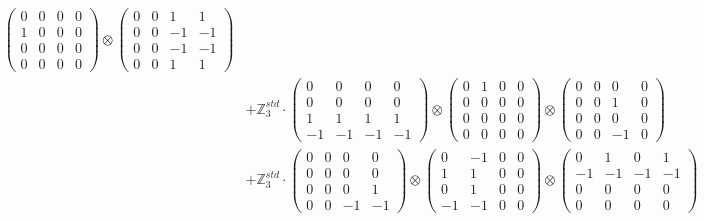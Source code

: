 \documentclass{article}
\begin{document}
{\begin{align}
            \begin{pmatrix} 0 & 0 & 0 & 0 \\ 1 & 0 & 0 & 0 \\ 0 & 0 & 0 & 0 \\ 0 & 0 & 0 & 0 \end{pmatrix} \otimes 
            \begin{pmatrix} 0 & 0 & 1 & 1 \\ 0 & 0 & -1 & -1 \\ 0 & 0 & -1 & -1 \\ 0 & 0 & 1 & 1 \end{pmatrix} \\ 
        &+ \label{Rs4-Rc15-Solution-1-c12} \mathbb{Z}_3^{std} \cdot 
            \begin{pmatrix} 0 & 0 & 0 & 0 \\ 0 & 0 & 0 & 0 \\ 1 & 1 & 1 & 1 \\ -1 & -1 & -1 & -1 \end{pmatrix} \otimes 
            \begin{pmatrix} 0 & 1 & 0 & 0 \\ 0 & 0 & 0 & 0 \\ 0 & 0 & 0 & 0 \\ 0 & 0 & 0 & 0 \end{pmatrix} \otimes 
            \begin{pmatrix} 0 & 0 & 0 & 0 \\ 0 & 0 & 1 & 0 \\ 0 & 0 & 0 & 0 \\ 0 & 0 & -1 & 0 \end{pmatrix} \\ 
        &+ \label{Rs4-Rc15-Solution-1-c13} \mathbb{Z}_3^{std} \cdot 
            \begin{pmatrix} 0 & 0 & 0 & 0 \\ 0 & 0 & 0 & 0 \\ 0 & 0 & 0 & 1 \\ 0 & 0 & -1 & -1 \end{pmatrix} \otimes 
            \begin{pmatrix} 0 & -1 & 0 & 0 \\ 1 & 1 & 0 & 0 \\ 0 & 1 & 0 & 0 \\ -1 & -1 & 0 & 0 \end{pmatrix} \otimes 
            \begin{pmatrix} 0 & 1 & 0 & 1 \\ -1 & -1 & -1 & -1 \\ 0 & 0 & 0 & 0 \\ 0 & 0 & 0 & 0 \end{pmatrix} \\ 

\end{align}}
\end{document}
